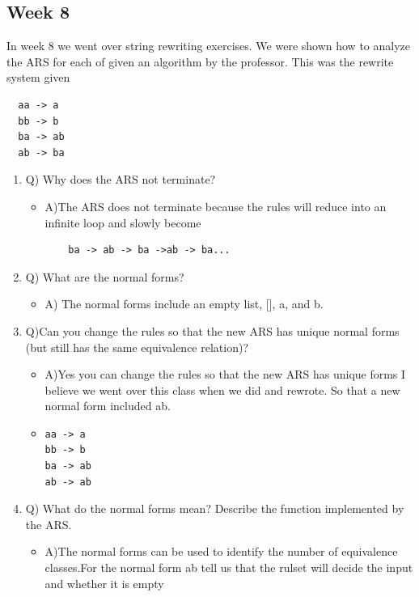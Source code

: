 \documentclass{article}
\theoremstyle{theorem}
\theoremstyle{definition}
\theoremstyle{remark}
\begin{document}
\subsection{Week 8}
 In week 8 we went over string rewriting exercises. We were shown how to analyze the ARS for each of given an algorithm by the professor.   This was the rewrite system given
\begin{verbatim}
  aa -> a
  bb -> b
  ba -> ab
  ab -> ba
  \end{verbatim}
 \begin{enumerate}
\item Q) Why does the ARS not terminate?
\begin{itemize}
\item  A)The ARS does not terminate because the rules will reduce into an infinite loop and slowly become 
\begin{verbatim}
    ba -> ab -> ba ->ab -> ba...
\end{verbatim}

\end{itemize}
\item Q) What are the normal forms? 
\begin{itemize}
\item A) The normal forms include an empty list, [], a, and b. 
\end{itemize}
\item Q)Can you change the rules so that the new ARS has unique normal forms (but still has the same equivalence relation)? 
\begin{itemize}
\item A)Yes you can change the rules so that the new ARS has unique forms I believe we went over this class when we did and rewrote. So that a new normal form included ab.
\item \begin{verbatim}
aa -> a
bb -> b
ba -> ab
ab -> ab
\end{verbatim}
\end{itemize}

\item Q) What do the normal forms mean? Describe the function implemented by the ARS. 
\begin{itemize}
\item A)The normal forms can be used to identify the number of equivalence classes.For the normal form ab tell us that the rulset will decide the input and whether it is empty
\end{itemize}

   \end{enumerate}
\end{document}
